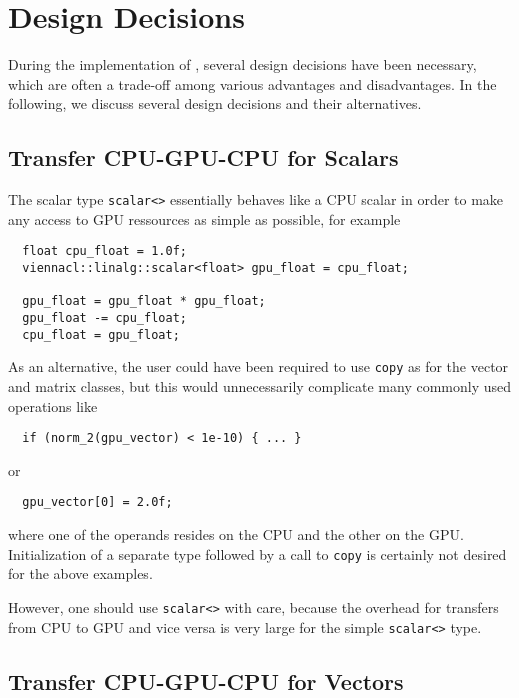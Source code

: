 \chapter{Design Decisions}
During the implementation of {\ViennaCL}, several design decisions have been
necessary, which are often a trade-off among various advantages and
disadvantages. In the following, we discuss several design decisions and their alternatives.

\section{Transfer CPU-GPU-CPU for Scalars}
The {\ViennaCL} scalar type \lstinline|scalar<>| essentially behaves like a CPU
scalar in order to make any access to GPU ressources as simple as possible, for example
\begin{lstlisting}
  float cpu_float = 1.0f;
  viennacl::linalg::scalar<float> gpu_float = cpu_float;

  gpu_float = gpu_float * gpu_float;
  gpu_float -= cpu_float;
  cpu_float = gpu_float;
\end{lstlisting}
As an alternative, the user could have been required to use \lstinline|copy| as
for the vector and matrix classes, but this would unnecessarily complicate many
commonly used operations like
\begin{lstlisting}
  if (norm_2(gpu_vector) < 1e-10) { ... }
\end{lstlisting}
or
\begin{lstlisting}
  gpu_vector[0] = 2.0f;
\end{lstlisting}
where one of the operands resides on the CPU and the other on the GPU. 
Initialization of a separate type followed by a call to \lstinline|copy| is
certainly not desired for the above examples.

However, one should use \lstinline|scalar<>| with care, because the
overhead for transfers from CPU to GPU and vice versa is very large for the
simple \lstinline|scalar<>| type.



\section{Transfer CPU-GPU-CPU for Vectors}

